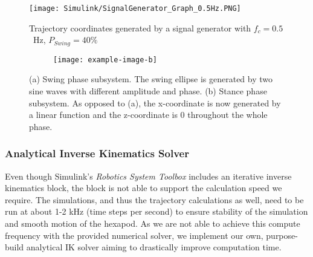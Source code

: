 \begin{figure}[!h]
	\centerline{\texttt{[image: Simulink/SignalGenerator\_Graph\_0.5Hz.PNG]}}
	\caption{Trajectory coordinates generated by a signal generator with $f_c=0.5$\ Hz, $P_{Swing}=40\text{\%}$}
	\label{figure: Trajectory graphs}
\end{figure}

\begin{figure}[!h]
	\centering
	\begin{subfigure}[b]{0.55\textwidth}
		
		\caption{}
		\label{fig:Ng1} 
	\end{subfigure}
	
	\begin{subfigure}[b]{0.55\textwidth}
	\texttt{[image: example-image-b]}
		\caption{}
		\label{fig:Ng2}
	\end{subfigure}
	
	\caption[Swing and Stance Phase]{(a) Swing phase subsystem. The swing ellipse is generated by two sine waves with different amplitude and phase. (b) Stance phase subsystem. As opposed to (a), the x-coordinate is now generated by a linear function and the z-coordinate is 0 throughout the whole phase.}
\end{figure}


\subsubsection{Analytical Inverse Kinematics Solver} \label{subsubsec: IK Solver}
Even though Simulink's \textit{Robotics System Toolbox} includes an iterative inverse kinematics block, the block is not able to support the calculation speed we require.
The simulations, and thus the trajectory calculations as well, need to be run at about 1-2 kHz (time steps per second) to ensure stability of the simulation and smooth motion of the hexapod.
As we are not able to achieve this compute frequency with the provided numerical solver, we implement our own, purpose-build analytical IK solver aiming to drastically improve computation time.

